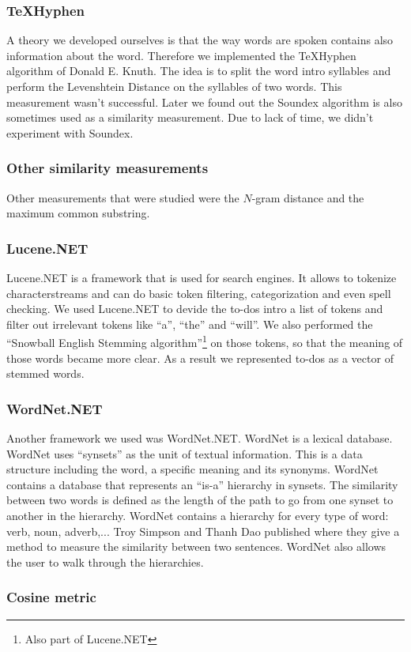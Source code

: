 \documentclass[a4paper,titlepage]{article}
\begin{document}
\subsubsection{TeXHyphen}
A theory we developed ourselves is that the way words are spoken contains also information about the word. Therefore we implemented the TeXHyphen algorithm\cite[p.376-406]{knuth1986tex} of Donald E. Knuth. The idea is to split the word intro syllables and perform the Levenshtein Distance on the syllables of two words. This measurement wasn't successful. Later we found out the Soundex algorithm is also sometimes used as a similarity measurement. Due to lack of time, we didn't experiment with Soundex.
\subsubsection{Other similarity measurements}
Other measurements that were studied were the $N$-gram distance and the maximum common substring.
\subsubsection{Lucene.NET}
Lucene.NET is a framework that is used for search engines. It allows to tokenize characterstreams and can do basic token filtering, categorization and even spell checking. We used Lucene.NET to devide the to-dos intro a list of tokens and filter out irrelevant tokens like ``a'', ``the'' and ``will''. We also performed the ``Snowball English Stemming algorithm''\footnote{Also part of Lucene.NET} on those tokens, so that the meaning of those words became more clear. As a result we represented to-dos as a vector of stemmed words.
\subsubsection{WordNet.NET}
Another framework we used was WordNet.NET. WordNet is a lexical database. WordNet uses ``synsets'' as the unit of textual information. This is a data structure including the word, a specific meaning and its synonyms. WordNet contains a database that represents an ``is-a'' hierarchy in synsets. The similarity between two words is defined as the length of the path to go from one synset to another in the hierarchy. WordNet contains a hierarchy for every type of word: verb, noun, adverb,... Troy Simpson and Thanh Dao published \cite{codeproject1} where they give a method to measure the similarity between two sentences. WordNet also allows the user to walk through the hierarchies.
\subsubsection{Cosine metric}
\end{document}
